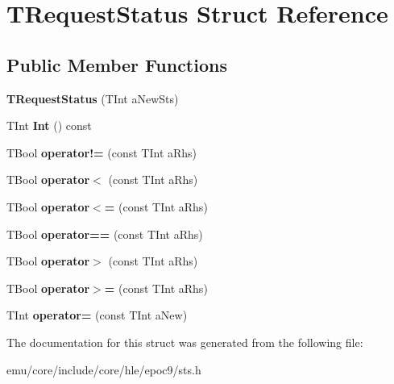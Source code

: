 \hypertarget{struct_t_request_status}{}\section{T\+Request\+Status Struct Reference}
\label{struct_t_request_status}
\subsection*{Public Member Functions}
\begin{DoxyCompactItemize}
\item 
\mbox{\label{struct_t_request_status_a6af56fa6b1309096420d4c6917c222eb}} 
{\bfseries T\+Request\+Status} (T\+Int a\+New\+Sts)
\item 
\mbox{\label{struct_t_request_status_a0b72a2c7f994dbaa426ab86b07ef7306}} 
T\+Int {\bfseries Int} () const
\item 
\mbox{\label{struct_t_request_status_a8b1d55682cc5cba46c1486f74bcc5996}} 
T\+Bool {\bfseries operator!=} (const T\+Int a\+Rhs)
\item 
\mbox{\label{struct_t_request_status_a3ed15eb3e4c77daef1850d64f3fcc9be}} 
T\+Bool {\bfseries operator$<$} (const T\+Int a\+Rhs)
\item 
\mbox{\label{struct_t_request_status_a790c6f754cd1559bd09bf3cf50d72882}} 
T\+Bool {\bfseries operator$<$=} (const T\+Int a\+Rhs)
\item 
\mbox{\label{struct_t_request_status_a08d9e163d270f35a424f90bc09924e67}} 
T\+Bool {\bfseries operator==} (const T\+Int a\+Rhs)
\item 
\mbox{\label{struct_t_request_status_a4b85c73a5260fc111d5f5939c8e65cfe}} 
T\+Bool {\bfseries operator$>$} (const T\+Int a\+Rhs)
\item 
\mbox{\label{struct_t_request_status_ae6bfbd603da3696c8b63cc9ca2d701c4}} 
T\+Bool {\bfseries operator$>$=} (const T\+Int a\+Rhs)
\item 
\mbox{\label{struct_t_request_status_a65fa91f4fdd0988eac9308e562cea206}} 
T\+Int {\bfseries operator=} (const T\+Int a\+New)
\end{DoxyCompactItemize}


The documentation for this struct was generated from the following file\+:\begin{DoxyCompactItemize}
\item 
emu/core/include/core/hle/epoc9/sts.\+h\end{DoxyCompactItemize}
